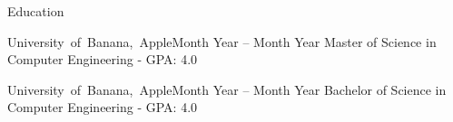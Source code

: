 \documentclass[]{../mcdowellcv}
\begin{document}
\begin{cvsection}{Education}

    \begin{cvsubsection}{\mbox {University of Banana, Apple}}{}{Month Year -- Month Year}
        Master of Science in Computer Engineering - GPA: 4.0
    \end{cvsubsection}
    
    \begin{cvsubsection}{\mbox {University of Banana, Apple}}{}{Month Year -- Month Year}
        Bachelor of Science in Computer Engineering - GPA: 4.0
    \end{cvsubsection}
     
\end{cvsection}
\end{document}
